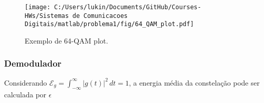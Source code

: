 \begin{figure}[!ht]
    \centering
    \texttt{[image: C:/Users/lukin/Documents/GitHub/Courses-HWs/Sistemas de Comunicacoes Digitais/matlab/problema1/fig/64\_QAM\_plot.pdf]}
    \caption{Exemplo de 64-QAM plot.}
    \label{fig:64_QAM_plot}
\end{figure}

\clearpage

\subsubsection{Demodulador}

Considerando $\mathcal{E}_g = \int_{-\infty}^{\infty} |g(t)|^2 \,dt = 1$, a energia média da constelação pode ser calculada por $\epsilon$



